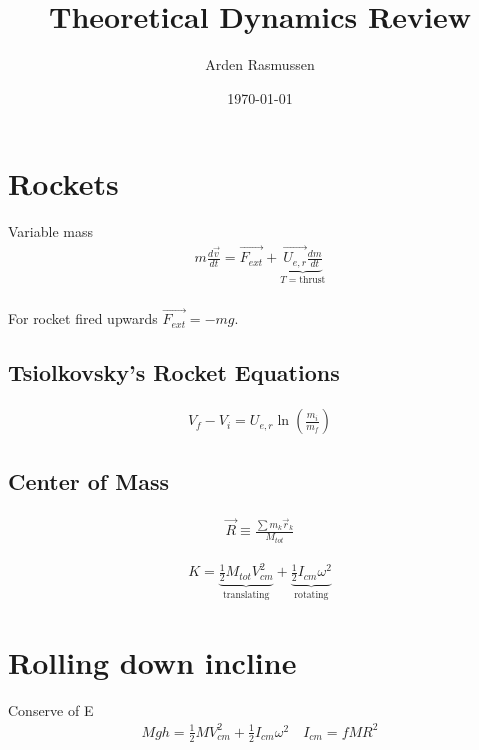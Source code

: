\documentclass[10pt]{amsart}
\title{Theoretical Dynamics Review}
\author{Arden Rasmussen}
\date{\today}
\newcommand{\vc}[1]{\overrightarrow{#1}}
\begin{document}
\maketitle


\begin{multicols}{2}

  \section{Rockets}%
  \label{sec:rockets}

  Variable mass
  \begin{align*}
    m\frac{d\vec{v}}{dt}=\vc{F_{ext}}+\underbrace{\vc{U_{e,r}}\frac{dm}{dt}}_{T=\text{thrust}}\\
  \end{align*}

  For rocket fired upwards $\vc{F_{ext}}=-mg$.

  \subsection{Tsiolkovsky's Rocket Equations}%
  \label{sub:tsiolkovsky_s_rocket_equations}

  \begin{align*}
    V_f-V_i=U_{e,r}\ln\left(\frac{m_i}{m_f}\right)
  \end{align*}

  \subsection{Center of Mass}%
  \label{sub:center_of_mass}

  \begin{align*}
    \vc{R}\equiv\frac{\sum m_k\vc{r}_k}{M_{tot}}
  \end{align*}

  \begin{align*}
    K=\underbrace{\frac{1}{2}M_{tot}V^2_{cm}}_\text{translating}
    +\underbrace{\frac{1}{2}I_{cm}\omega^2}_\text{rotating}
  \end{align*}

  \section{Rolling down incline}%
  \label{sec:rolling_down_incline}

  Conserve of E
  \begin{align*}
    Mgh=\frac{1}{2}MV^2_{cm}+\frac{1}{2}I_{cm}\omega^2\quad I_{cm}=fMR^2
  \end{align*}


\end{multicols}
\end{document}
